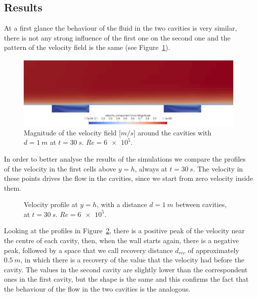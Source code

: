 \documentclass[11pt, a4paper]{article}
\theoremstyle{definition}
\begin{document}
\subsection{Results}
At a first glance the behaviour of the fluid in the two cavities is very 
similar, there is not any strong influence of the first one on the second one 
and the pattern of the velocity field is the same (see Figure~\ref{fig:veld1}). 
\begin{figure}
	\centering
	\includegraphics[width=\textwidth, trim={0 0 0 6cm}, 
	clip]{cavities_dist1_vel}
	\caption{Magnitude of the velocity field [$\si{m/s}$] around the cavities 
		with $d=\SI{1}{m}$ at $t=\SI{30}{s}$. $Re=\num{6e5}$.}
	\label{fig:veld1}
\end{figure}

In order to better analyse the results of the simulations we compare the 
profiles of the velocity in the first cells above $y=h$, always at 
$t=\SI{30}{s}$. The velocity in these points drives the flow in the cavities, 
since we start from zero velocity inside them.
\begin{figure}
	\centering
	
	\caption{Velocity profile at $y=h$, with a distance $d=\SI{1}{m}$ between 
		cavities, at $t=\SI{30}{s}$. $Re = \num{6e5}$.}
	\label{fig:velprofile1}
\end{figure}

Looking at the profiles in Figure~\ref{fig:velprofile1}, there is a positive 
peak of the velocity near the centre of each cavity, then, when the wall starts 
again, there is a negative peak, followed by a space that we call recovery 
distance $d_{rec}$ of approximately $\SI{0.5}{m}$, in which there is a recovery 
of the value that the velocity had before the cavity. The values in the second 
cavity are slightly lower than the correspondent ones in the first cavity, but 
the shape is the same and this confirms the fact that the behaviour of the flow 
in the two cavities is the analogous.
\end{document}
